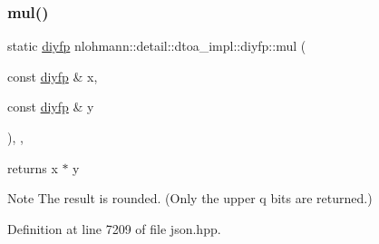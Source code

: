 \subsubsection{\texorpdfstring{mul()}{mul()}}
{\footnotesize\ttfamily static \hyperlink{structnlohmann_1_1detail_1_1dtoa__impl_1_1diyfp}{diyfp} nlohmann\+::detail\+::dtoa\+\_\+impl\+::diyfp\+::mul (\begin{DoxyParamCaption}\item[{const \hyperlink{structnlohmann_1_1detail_1_1dtoa__impl_1_1diyfp}{diyfp} \&}]{x,  }\item[{const \hyperlink{structnlohmann_1_1detail_1_1dtoa__impl_1_1diyfp}{diyfp} \&}]{y }\end{DoxyParamCaption})\hspace{0.3cm}{\ttfamily [inline]}, {\ttfamily [static]}, {\ttfamily [noexcept]}}



returns x $\ast$ y 

\begin{DoxyNote}{Note}
The result is rounded. (Only the upper q bits are returned.) 
\end{DoxyNote}


Definition at line 7209 of file json.\+hpp.


